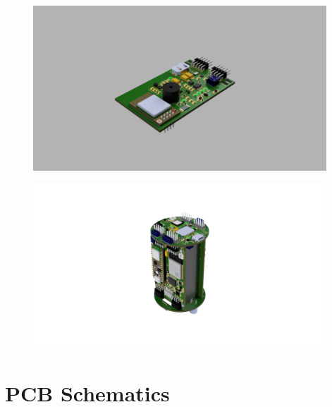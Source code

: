 \documentclass[11pt]{article}
\begin{document}
\begin{figure}
    \centering
    \includegraphics[width=11cm]{images/Powerboard_v2.png}
    \label{fig:img4}
\end{figure}

\begin{figure}
    \centering
    \includegraphics[width=11cm]{images/Assembled cansat.png}
    \label{fig:img5}
\end{figure}

\section{PCB Schematics}\label{A3}
\end{document}
